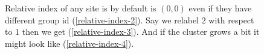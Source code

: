 	\begin{figure}
		\centering
		\caption{Relative index of any site is by default is $(0,0)$ even if they have different group id (\ref{relative-index-2}). Say we relabel $2$ with respect to $1$ then we get (\ref{relative-index-3}). And if the cluster grows a bit it might look like (\ref{relative-index-4}).}
	\end{figure}


